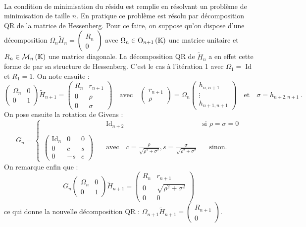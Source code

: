 		\paragraph{}
		La condition de minimisation du résidu est remplie en résolvant un problème de minimisation de taille $n$.
		En pratique ce problème est résolu par décomposition QR de la matrice de Hessenberg.
		Pour ce faire, on suppose qu'on dispose d'une décomposition $\Omega_n\widetilde{H}_n = \begin{pmatrix}R_n \\ 0\end{pmatrix}$ avec $\Omega_n\in\operatorname{O}_{n+1}\left(\mathbb{K}\right)$ une matrice unitaire et $R_n\in\mathcal{M}_{n}\left(\mathbb{K}\right)$ une matrice diagonale.
		La décomposition QR de $\widetilde{H}_n$ a en effet cette forme de par sa structure de Hessenberg.
		C'est le cas à l'itération 1 avec $\Omega_1 = \operatorname{Id}$ et $R_1 = 1$.
		On note ensuite :
		\[\begin{pmatrix}\Omega_n & 0 \\ 0 & 1\end{pmatrix}\widetilde{H}_{n+1} = \begin{pmatrix}R_n & r_{n+1} \\ 0 & \rho \\ 0 & \sigma\end{pmatrix} \quad\textrm{avec}\quad \begin{pmatrix}r_{n+1} \\ \rho\end{pmatrix} = \Omega_n\begin{pmatrix}h_{n,n+1} \\ \vdots \\ h_{n+1,n+1}\end{pmatrix} \quad\textrm{et}\quad \sigma = h_{n+2,n+1}\ .\]
		On pose ensuite la rotation de Givens :
		\[G_n = \left\{\begin{aligned}
			&\quad\operatorname{Id}_{n+2} &\textrm{si }\rho = \sigma = 0\\ \\
			\begin{pmatrix}\operatorname{Id}_n & 0 & 0 \\ 0 & c & s \\ 0 & -s & c\end{pmatrix}& \quad\textrm{avec}\quad c = \frac{\rho}{\sqrt{\rho^2 + \sigma^2}}, s = \frac{\sigma}{\sqrt{\rho^2 + \sigma^2}} &\quad\textrm{sinon.}
		\end{aligned}\right.\]
		On remarque enfin que :
		\[G_n\begin{pmatrix}\Omega_n & 0 \\ 0 & 1\end{pmatrix}\widetilde{H}_{n+1} = \begin{pmatrix}R_n & r_{n+1} \\ 0 & \sqrt{\rho^2 + \sigma^2} \\ 0 & 0\end{pmatrix}\]
		ce qui donne la nouvelle décomposition QR : $\Omega_{n+1}\widetilde{H}_{n+1} = \begin{pmatrix}R_{n+1} \\ 0\end{pmatrix}$.


